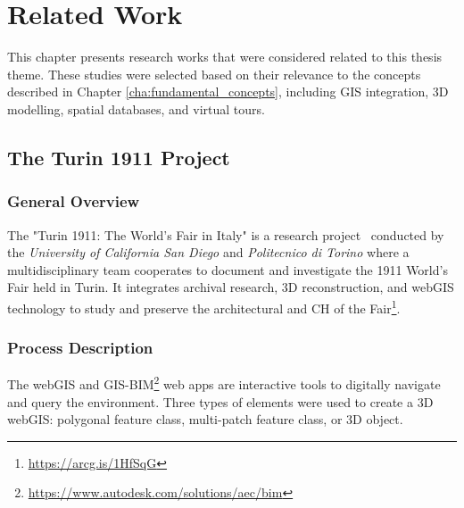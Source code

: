 
%


\chapter{Related Work}
\label{cha:related_work}

This chapter presents research works that were considered related to this thesis theme.
These studies were selected based on their relevance to the concepts described in Chapter \ref{cha:fundamental_concepts}, including \gls{GIS} integration, \gls{3D} modelling, spatial databases, and virtual tours.

\section{The Turin 1911 Project}
\label{sec:turin_project} 

\subsection*{General Overview}

The "Turin 1911: The World's Fair in Italy" is a research project~\cite{article} conducted by the \textit{University of California San Diego} and  \textit{Politecnico di Torino} where a multidisciplinary team cooperates to document and investigate the 1911 World’s Fair held in Turin.
It integrates archival research, \gls{3D} reconstruction, and web\gls{GIS} technology to study and preserve the architectural and \gls{CH} of the Fair\footnote{\url{https://arcg.is/1HfSqG}}.

\subsection*{Process Description}

The web\gls{GIS} and \gls{GIS}-\gls{BIM}\footnote{\url{https://www.autodesk.com/solutions/aec/bim}} web apps are interactive tools to digitally navigate and query the environment. 
Three types of elements were used to create a \gls{3D} web\gls{GIS}: polygonal feature class, multi-patch feature class, or \gls{3D} object.

